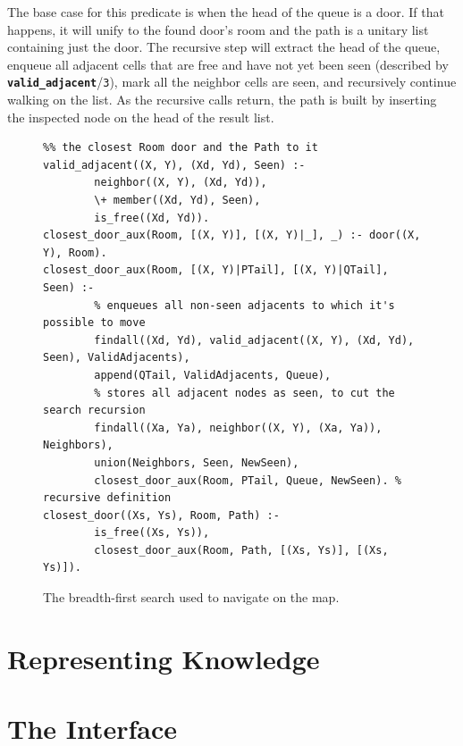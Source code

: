 \documentclass[12pt,a4paper]{article}
\newcommand{\varname}[1]{\texttt{#1}}
\newcommand{\varnamebf}[1]{\textbf{\texttt{#1}}}
\newcommand{\predprot}[2]{{\color{MidnightBlue}\varnamebf{#1}}/{\color{Mulberry}\varname{#2}}}
\begin{document}
The base case for this predicate is when the head of the queue is a door. If that happens, it will unify to the found door's room and the path is a unitary list containing just the door. The recursive step will extract the head of the queue, enqueue all adjacent cells that are free and have not yet been seen (described by \predprot{valid\_adjacent}{3}), mark all the neighbor cells are seen, and recursively continue walking on the list. As the recursive calls return, the path is built by inserting the inspected node on the head of the result list.

\begin{figure}[H]
	\centering
\begin{lstlisting}[style=Prolog-pygsty]
%% closest_door((Xs, Ys), Room, Path) - starting at <Xs, Ys>, finds
%% the closest Room door and the Path to it
valid_adjacent((X, Y), (Xd, Yd), Seen) :-
		neighbor((X, Y), (Xd, Yd)),
		\+ member((Xd, Yd), Seen),
		is_free((Xd, Yd)).
closest_door_aux(Room, [(X, Y)], [(X, Y)|_], _) :- door((X, Y), Room).
closest_door_aux(Room, [(X, Y)|PTail], [(X, Y)|QTail], Seen) :-
		% enqueues all non-seen adjacents to which it's possible to move
		findall((Xd, Yd), valid_adjacent((X, Y), (Xd, Yd), Seen), ValidAdjacents),
		append(QTail, ValidAdjacents, Queue),
		% stores all adjacent nodes as seen, to cut the search recursion
		findall((Xa, Ya), neighbor((X, Y), (Xa, Ya)), Neighbors),
		union(Neighbors, Seen, NewSeen),
		closest_door_aux(Room, PTail, Queue, NewSeen). % recursive definition
closest_door((Xs, Ys), Room, Path) :-
		is_free((Xs, Ys)),
		closest_door_aux(Room, Path, [(Xs, Ys)], [(Xs, Ys)]).
\end{lstlisting}
	\caption{The breadth-first search used to navigate on the map.} 
	\label{fig:bfs}
\end{figure}

\section{Representing Knowledge}
\label{sec:data}

\section{The Interface}
\label{sec:interface}
\end{document}
